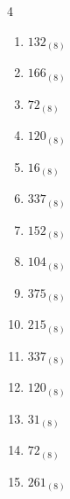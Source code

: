 \begin{multicols}{4}
\begin{enumerate}
        \phantom{$=11$}

  \item $132_{(8)}$

        \phantom{$=90$}

  \item $166_{(8)}$

        \phantom{$=118$}

  \item $72_{(8)}$

        \phantom{$=58$}

  \item $120_{(8)}$

        \phantom{$=80$}

  \item $16_{(8)}$

        \phantom{$=14$}

  \item $337_{(8)}$

        \phantom{$=223$}

  \item $152_{(8)}$

        \phantom{$=106$}

  \item $104_{(8)}$

        \phantom{$=68$}

\columnbreak %

  \item $375_{(8)}$

        \phantom{$=253$}

  \item $215_{(8)}$

        \phantom{$=141$}

  \item $337_{(8)}$

        \phantom{$=223$}

  \item $120_{(8)}$

        \phantom{$=80$}

  \item $31_{(8)}$

        \phantom{$=25$}

  \item $72_{(8)}$

        \phantom{$=58$}

  \item $261_{(8)}$

        \phantom{$=177$}


\end{enumerate}
\end{multicols}
